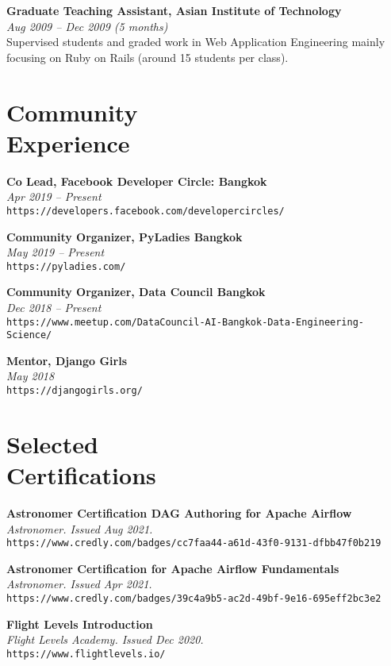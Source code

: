 \documentclass[margin, 10pt]{res}
\begin{document}
\begin{resume}
{\bf Graduate Teaching Assistant, Asian Institute of Technology}\\
{\it \small Aug 2009 -- Dec 2009 (5 months)}\\
Supervised students and graded work in Web Application Engineering mainly focusing
on Ruby on Rails (around 15 students per class).

\section{Community \\ Experience}

{\bf Co Lead, Facebook Developer Circle: Bangkok}\\
{\it \small Apr 2019 -- Present}\\
{\tt https://developers.facebook.com/developercircles/}

{\bf Community Organizer, PyLadies Bangkok}\\
{\it \small May 2019 -- Present}\\
{\tt https://pyladies.com/}

{\bf Community Organizer, Data Council Bangkok}\\
{\it \small Dec 2018 -- Present}\\
{\tt https://www.meetup.com/DataCouncil-AI-Bangkok-Data-Engineering-Science/}

{\bf Mentor, Django Girls}\\
{\it \small May 2018}\\
{\tt https://djangogirls.org/}

\section{Selected \\ Certifications}

{\bf Astronomer Certification DAG Authoring for Apache Airflow}\\
{\it \small Astronomer. Issued Aug 2021.}\\
{\tt https://www.credly.com/badges/cc7faa44-a61d-43f0-9131-dfbb47f0b219}

{\bf Astronomer Certification for Apache Airflow Fundamentals}\\
{\it \small Astronomer. Issued Apr 2021.}\\
{\tt https://www.credly.com/badges/39c4a9b5-ac2d-49bf-9e16-695eff2bc3e2}

{\bf Flight Levels Introduction}\\
{\it \small Flight Levels Academy. Issued Dec 2020.}\\
{\tt https://www.flightlevels.io/}


\end{resume}
\end{document}
